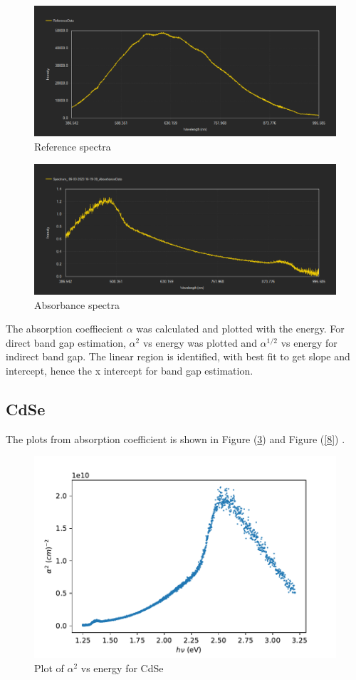 \documentclass[a4paper, amsfonts, amssymb, amsmath, reprint, showkeys, nofootinbib, twoside]{revtex4-1}
\begin{document}
\begin{figure}[H]
	\centering
	\includegraphics[scale=0.3]{Ref}
	\caption{Reference spectra}
	\label{5}
\end{figure}

\begin{figure}[H]
	\centering
	\includegraphics[scale=0.3]{Abs}
	\caption{Absorbance spectra}
	\label{6}
\end{figure}

The absorption coeffiecient $\alpha$ was calculated and plotted with the energy. For direct band gap estimation, $\alpha^2$ vs energy was plotted and $\alpha^{1/2}$ vs energy for indirect band gap. The linear region is identified, with best fit to get slope and intercept, hence the x intercept for band gap estimation.

\subsection{CdSe}
The plots from absorption coefficient is shown in Figure (\ref{7}) and Figure (\ref{8}) .
\begin{figure}[H]
	\centering
	\includegraphics[scale=0.6]{cse}
	\caption{Plot of $\alpha^2$ vs energy for CdSe}
	\label{7}
\end{figure}
\end{document}
